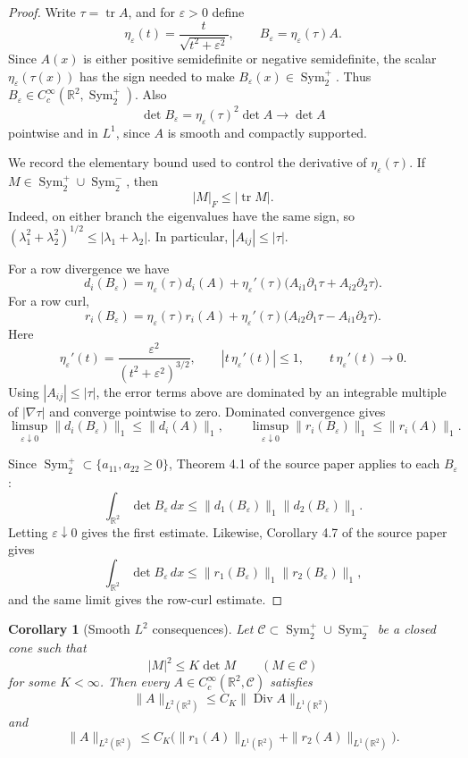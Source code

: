 \documentclass[11pt]{article}
\newtheorem{corollary}{Corollary}
\newcommand{\R}{\mathbb R}
\newcommand{\Sym}{\operatorname{Sym}}
\newcommand{\tr}{\operatorname{tr}}
\newcommand{\Div}{\operatorname{Div}}
\begin{document}
\begin{proof}
Write \(\tau=\tr A\), and for \(\varepsilon>0\) define
\[
  \eta_\varepsilon(t)=\frac{t}{\sqrt{t^2+\varepsilon^2}},
  \qquad
  B_\varepsilon=\eta_\varepsilon(\tau)A .
\]
Since \(A(x)\) is either positive semidefinite or negative semidefinite, the
scalar \(\eta_\varepsilon(\tau(x))\) has the sign needed to make
\(B_\varepsilon(x)\in\Sym_2^+\). Thus \(B_\varepsilon\in
C_c^\infty(\R^2,\Sym_2^+)\). Also
\[
  \det B_\varepsilon
  =
  \eta_\varepsilon(\tau)^2 \det A
  \to
  \det A
\]
pointwise and in \(L^1\), since \(A\) is smooth and compactly supported.

We record the elementary bound used to control the derivative of
\(\eta_\varepsilon(\tau)\). If \(M\in\Sym_2^+\cup\Sym_2^-\), then
\[
  |M|_F\leq |\tr M|.
\]
Indeed, on either branch the eigenvalues have the same sign, so
\((\lambda_1^2+\lambda_2^2)^{1/2}\leq |\lambda_1+\lambda_2|\).
In particular, \(|A_{ij}|\leq |\tau|\).

For a row divergence we have
\[
  d_i(B_\varepsilon)
  =
  \eta_\varepsilon(\tau)d_i(A)
  +
  \eta_\varepsilon'(\tau)\bigl(A_{i1}\partial_1\tau
  +A_{i2}\partial_2\tau\bigr).
\]
For a row curl,
\[
  r_i(B_\varepsilon)
  =
  \eta_\varepsilon(\tau)r_i(A)
  +
  \eta_\varepsilon'(\tau)\bigl(A_{i2}\partial_1\tau
  -A_{i1}\partial_2\tau\bigr).
\]
Here
\[
  \eta_\varepsilon'(t)=\frac{\varepsilon^2}{(t^2+\varepsilon^2)^{3/2}},
  \qquad
  |t\,\eta_\varepsilon'(t)|\leq 1,
  \qquad
  t\,\eta_\varepsilon'(t)\to0 .
\]
Using \(|A_{ij}|\leq|\tau|\), the error terms above are dominated by an
integrable multiple of \(|\nabla\tau|\) and converge pointwise to zero.
Dominated convergence gives
\[
  \limsup_{\varepsilon\downarrow0}\|d_i(B_\varepsilon)\|_1
  \leq \|d_i(A)\|_1,
  \qquad
  \limsup_{\varepsilon\downarrow0}\|r_i(B_\varepsilon)\|_1
  \leq \|r_i(A)\|_1 .
\]

Since \(\Sym_2^+\subset\{a_{11},a_{22}\geq0\}\), Theorem 4.1 of the source
paper applies to each \(B_\varepsilon\):
\[
  \int_{\R^2}\det B_\varepsilon\,dx
  \leq
  \|d_1(B_\varepsilon)\|_1\|d_2(B_\varepsilon)\|_1 .
\]
Letting \(\varepsilon\downarrow0\) gives the first estimate. Likewise,
Corollary 4.7 of the source paper gives
\[
  \int_{\R^2}\det B_\varepsilon\,dx
  \leq
  \|r_1(B_\varepsilon)\|_1\|r_2(B_\varepsilon)\|_1 ,
\]
and the same limit gives the row-curl estimate.
\end{proof}

\begin{corollary}[Smooth \(L^2\) consequences]
Let \(\mathcal C\subset\Sym_2^+\cup\Sym_2^-\) be a closed cone such that
\[
  |M|^2\leq K\det M\qquad(M\in\mathcal C)
\]
for some \(K<\infty\). Then every
\(A\in C_c^\infty(\R^2,\mathcal C)\) satisfies
\[
  \|A\|_{L^2(\R^2)}
  \leq C_K\|\Div A\|_{L^1(\R^2)}
\]
and
\[
  \|A\|_{L^2(\R^2)}
  \leq C_K\bigl(\|r_1(A)\|_{L^1(\R^2)}+\|r_2(A)\|_{L^1(\R^2)}\bigr).
\]
\end{corollary}
\end{document}

